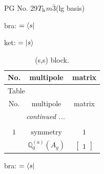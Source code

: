 \documentclass[fleqn,8pt,landscape]{jsarticle}
\begin{document}
\setcounter{MaxMatrixCols}{32}

\renewcommand{\tablename}{Table~}
\renewcommand{\figurename}{Figure~}
\begin{center}
\LARGE
PG No. 29\quad$T_{\rm h}$\quad$m\bar{3}$\quad[ cubic ] (lg basis)
\end{center}
bra: $=\bra{s}$

\noindent
ket: $=\ket{s}$
\renewcommand{\arraystretch}{1.6}
\begin{longtable}{ccc}
\caption{(s,s) block.}
 \\
 \hline \hline
No. & multipole & matrix \\ \hline \endfirsthead

\multicolumn{2}{l}{\tablename\ \thetable{}} \\
 \hline \hline
No. & multipole & matrix \\ \hline \endhead

 \hline \hline
\multicolumn{2}{r}{\footnotesize\it continued ...} \\ \endfoot

 \hline \hline
\multicolumn{2}{r}{} \\ \endlastfoot

$ 1 $ & $ \text{symmetry} $ & $ 1 $ \\
$  $ & $ \mathbb{Q}_{0}^{(a)}(A_{g}) $ & $ \begin{bmatrix} 1 \end{bmatrix} $ \\ \hline
\end{longtable}
bra: $=\bra{s}$
\end{document}
